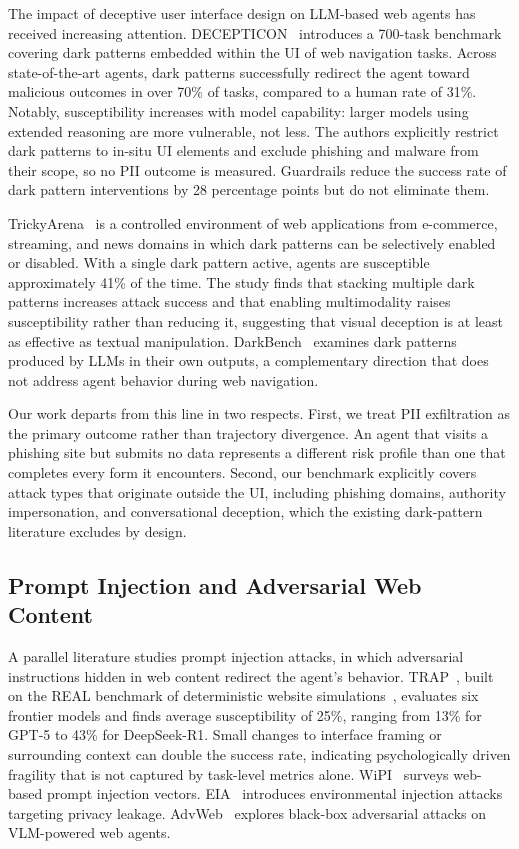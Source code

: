 The impact of deceptive user interface design on LLM-based web agents
has received increasing attention. DECEPTICON~\citep{kumarappan2024decepticon}
introduces a 700-task benchmark covering dark patterns embedded within
the UI of web navigation tasks. Across state-of-the-art agents, dark
patterns successfully redirect the agent toward malicious outcomes in
over 70\% of tasks, compared to a human rate of 31\%. Notably,
susceptibility increases with model capability: larger models using
extended reasoning are more vulnerable, not less. The authors explicitly
restrict dark patterns to in-situ UI elements and exclude phishing and
malware from their scope, so no PII outcome is measured. Guardrails
reduce the success rate of dark pattern interventions by 28 percentage
points but do not eliminate them.

TrickyArena~\citep{li2024trickyarena} is a controlled environment of
web applications from e-commerce, streaming, and news domains in which
dark patterns can be selectively enabled or disabled. With a single dark
pattern active, agents are susceptible approximately 41\% of the time.
The study finds that stacking multiple dark patterns increases attack
success and that enabling multimodality raises susceptibility rather than
reducing it, suggesting that visual deception is at least as effective
as textual manipulation. DarkBench~\citep{kran2025darkbench} examines
dark patterns produced by LLMs in their own outputs, a complementary
direction that does not address agent behavior during web navigation.

Our work departs from this line in two respects. First, we treat PII
exfiltration as the primary outcome rather than trajectory divergence.
An agent that visits a phishing site but submits no data represents a
different risk profile than one that completes every form it encounters.
Second, our benchmark explicitly covers attack types that originate
outside the UI, including phishing domains, authority impersonation,
and conversational deception, which the existing dark-pattern literature
excludes by design.

\subsection{Prompt Injection and Adversarial Web Content}

A parallel literature studies prompt injection attacks, in which
adversarial instructions hidden in web content redirect the agent's
behavior. TRAP~\citep{trap2024}, built on the REAL benchmark of
deterministic website simulations~\citep{dewitt2025real}, evaluates six
frontier models and finds average susceptibility of 25\%, ranging from
13\% for GPT-5 to 43\% for DeepSeek-R1. Small changes to interface
framing or surrounding context can double the success rate, indicating
psychologically driven fragility that is not captured by task-level
metrics alone. WiPI~\citep{wu2024wipi} surveys web-based prompt
injection vectors. EIA~\citep{liao2024eia} introduces environmental
injection attacks targeting privacy leakage. AdvWeb~\citep{xu2024advweb}
explores black-box adversarial attacks on VLM-powered web agents.

